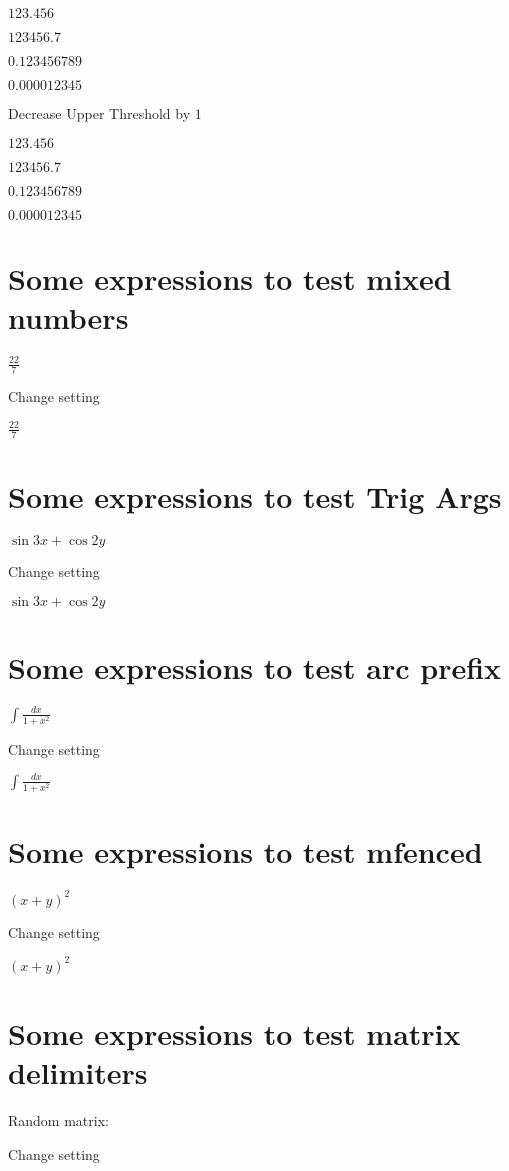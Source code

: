 \documentclass{article}
\begin{document}
$123.456$

$123456.7$

$0.123456789$

$0.000012345$

Decrease Upper Threshold by $1$

$123.456$

$123456.7$

$0.123456789$

$0.000012345$

\section{Some expressions to test mixed numbers}

$\frac{22}{7}$

Change setting

$\frac{22}{7}$

\section{Some expressions to test Trig Args}

$\sin 3x+\cos 2y$

Change setting

$\sin 3x+\cos 2y$

\section{Some expressions to test arc prefix}

$\int \frac{dx}{1+x^{2}}$

Change setting

$\int \frac{dx}{1+x^{2}}$

\noindent \hrulefill

\section{Some expressions to test mfenced}

$\left( x+y\right) ^{2}$

Change setting

$\left( x+y\right) ^{2}$

\section{Some expressions to test matrix delimiters}

Random matrix:

Change setting
\end{document}
